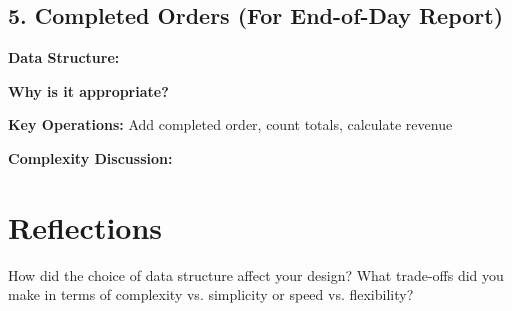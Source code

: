 \documentclass[12pt]{article}
\begin{document}
\vspace{2em}

\subsection*{5. Completed Orders (For End-of-Day Report)}
\textbf{Data Structure:} \hrulefill

\textbf{Why is it appropriate?} \hrulefill

\vspace{1em}
\textbf{Key Operations:} Add completed order, count totals, calculate revenue

\vspace{1em}
\textbf{Complexity Discussion:} \hrulefill

\vspace{2em}

\section*{Reflections}
How did the choice of data structure affect your design? What trade-offs did you make in terms of complexity vs. simplicity or speed vs. flexibility?

\vspace{4em}
\hrulefill

\vspace{4em}
\hrulefill
\end{document}
